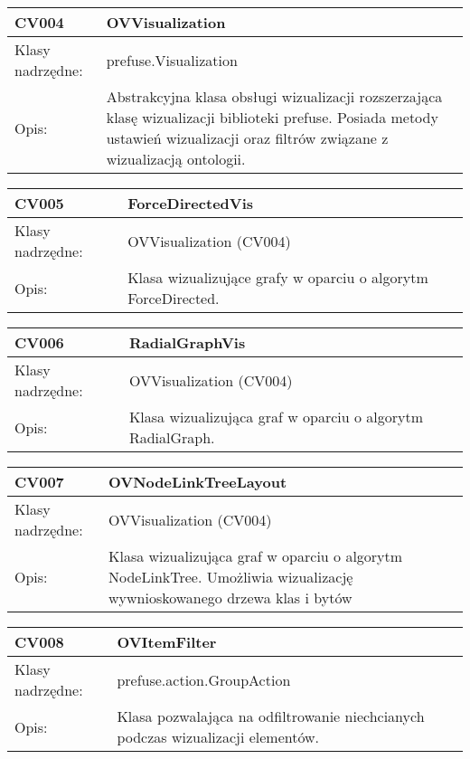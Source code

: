 \begin{longtable}{|m{3.5cm}|m{8.5cm}|} \hline

CV004 & OVVisualization \\ \hline
Klasy nadrzędne: &  prefuse.Visualization   \\ \hline
Opis: &  Abstrakcyjna klasa obsługi wizualizacji rozszerzająca klasę wizualizacji biblioteki prefuse. Posiada metody ustawień wizualizacji
 oraz filtrów związane z wizualizacją ontologii. \\ \hline

\end{longtable}

\begin{longtable}{|m{3.5cm}|m{8.5cm}|} \hline

CV005 & ForceDirectedVis \\ \hline
Klasy nadrzędne: & OVVisualization (CV004)  \\ \hline
Opis: &  Klasa wizualizujące grafy w oparciu o algorytm ForceDirected.   \\ \hline

\end{longtable}

\begin{longtable}{|m{3.5cm}|m{8.5cm}|} \hline

CV006 & RadialGraphVis \\ \hline
Klasy nadrzędne: & OVVisualization (CV004) \\ \hline
Opis: &  Klasa wizualizująca graf w oparciu o algorytm RadialGraph. \\ \hline

\end{longtable}

\begin{longtable}{|m{3.5cm}|m{8.5cm}|} \hline

CV007 & OVNodeLinkTreeLayout \\ \hline
Klasy nadrzędne: & OVVisualization (CV004) \\ \hline
Opis: &  Klasa wizualizująca graf w oparciu o algorytm NodeLinkTree. Umożliwia wizualizację wywnioskowanego drzewa klas i bytów \\ \hline

\end{longtable}

\begin{longtable}{|m{3.5cm}|m{8.5cm}|} \hline

CV008 & OVItemFilter \\ \hline
Klasy nadrzędne: & prefuse.action.GroupAction \\ \hline
Opis: &  Klasa pozwalająca na odfiltrowanie niechcianych podczas wizualizacji elementów. \\ \hline

\end{longtable}


